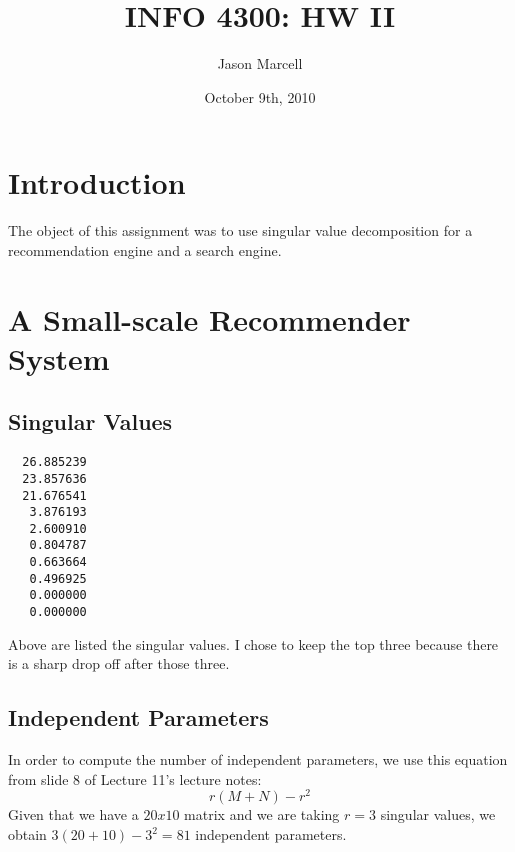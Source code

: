 \documentclass[12pt]{article}
\title{INFO 4300: HW II}
\author{Jason Marcell}
\date{October 9th, 2010}
\begin{document}
 
\maketitle 
\newpage
\section{Introduction} %
\label{sec:introduction}
The object of this assignment was to use singular value decomposition for a recommendation engine and a search engine.
\section{A Small-scale Recommender System} %
\label{sec:a_small_scale_recommender_system}
\subsection{Singular Values} %
\label{sub:singular_values}
\begin{lstlisting}
  26.885239
  23.857636
  21.676541
   3.876193
   2.600910
   0.804787
   0.663664
   0.496925
   0.000000
   0.000000
\end{lstlisting}
Above are listed the singular values. I chose to keep the top three because there is a sharp drop off after those three.
\subsection{Independent Parameters} %
\label{sub:independent_parameters}
In order to compute the number of independent parameters, we use this equation from slide 8 of Lecture 11's lecture notes:
\begin{equation}
  r(M+N)−r^2 
\end{equation}
Given that we have a $20x10$ matrix and we are taking $r=3$ singular values, we obtain $3(20+10)-3^2 = 81$ independent parameters.
\pagebreak
\end{document}
